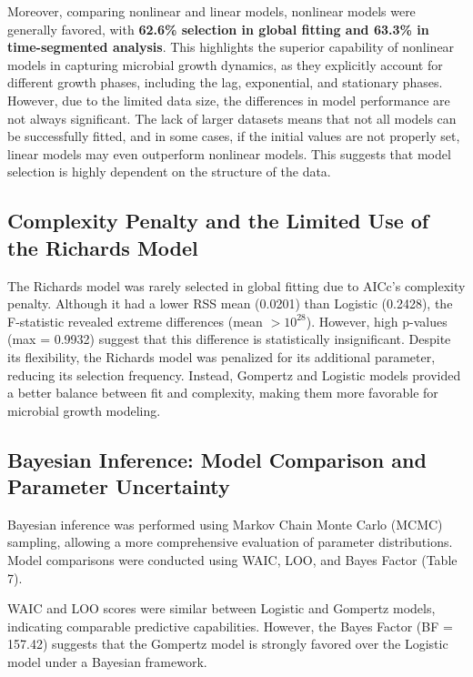\documentclass{article}
\begin{document}
Moreover, comparing nonlinear and linear models, nonlinear models were generally favored, with \textbf{62.6\% selection in global fitting and 63.3\% in time-segmented analysis}. This highlights the superior capability of nonlinear models in capturing microbial growth dynamics, as they explicitly account for different growth phases, including the lag, exponential, and stationary phases. However, due to the limited data size, the differences in model performance are not always significant. The lack of larger datasets means that not all models can be successfully fitted, and in some cases, if the initial values are not properly set, linear models may even outperform nonlinear models. This suggests that model selection is highly dependent on the structure of the data.
\subsection{Complexity Penalty and the Limited Use of the Richards Model}

The Richards model was rarely selected in global fitting due to AICc’s complexity penalty. Although it had a lower RSS mean (0.0201) than Logistic (0.2428), the F-statistic revealed extreme differences (mean $>10^{28}$). However, high p-values (max = 0.9932) suggest that this difference is statistically insignificant. Despite its flexibility, the Richards model was penalized for its additional parameter, reducing its selection frequency. Instead, Gompertz and Logistic models provided a better balance between fit and complexity, making them more favorable for microbial growth modeling.


\subsection{Bayesian Inference: Model Comparison and Parameter Uncertainty}
Bayesian inference was performed using Markov Chain Monte Carlo (MCMC) sampling, allowing a more comprehensive evaluation of parameter distributions. Model comparisons were conducted using WAIC, LOO, and Bayes Factor (Table 7). 

WAIC and LOO scores were similar between Logistic and Gompertz models, indicating comparable predictive capabilities. However, the Bayes Factor (BF = 157.42) suggests that the Gompertz model is strongly favored over the Logistic model under a Bayesian framework.
\end{document}
